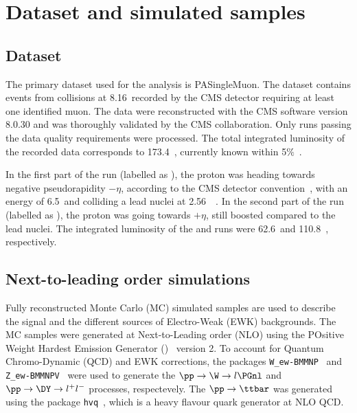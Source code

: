 \section{Dataset and simulated samples} \label{sec:WBoson_Samples}

\subsection{Dataset} \label{sec:WBoson_Samples_Data}

The primary dataset used for the \W analysis is PASingleMuon. The dataset contains events from \pPb collisions at 8.16~\TeV recorded by the CMS detector requiring at least one identified muon. The data were reconstructed with the CMS software version 8.0.30 and was thoroughly validated by the CMS collaboration. Only runs passing the data quality requirements were processed. The total integrated luminosity of the recorded data corresponds to 173.4~\nbinv, currently known within 5$\%$~\cite{LUMI}.

In the first part of the \pPb run (labelled as \RunPbp), the proton was heading towards negative pseudorapidity $-\eta$, according to the CMS detector convention~\cite{CMS}, with an energy of 6.5~\TeV and colliding a lead nuclei at 2.56~\TeV~\cite{LHC}. In the second part of the \pPb run (labelled as \RunpPb), the proton was going towards $+\eta$, still boosted compared to the lead nuclei. The integrated luminosity of the \RunPbp and \RunpPb runs were 62.6~\nbinv and 110.8~\nbinv, respectively.

\subsection{Next-to-leading order simulations} \label{sec:WBoson_Sample_MC}

Fully reconstructed Monte Carlo (MC) simulated samples are used to describe the signal and the different sources of Electro-Weak (EWK) backgrounds. The MC samples were generated at Next-to-Leading order (NLO) using the POsitive Weight Hardest Emission Generator (\POWHEG)~\cite{POWHEG,POWHEG_2,POWHEGBOX} version 2. To account for Quantum Chromo-Dynamic (QCD) and EWK corrections, the \POWHEGBOX  packages \verb#W_ew-BMMNP#~\cite{POWHEGBOX_W_ew_BMNNP} and \verb#Z_ew-BMMNPV#~\cite{POWHEGBOX_Z_ew_BMNNP} were used to generate the $\pp\to\W\to l\PGnl$ and $\pp\to\DY\to l^{+}l^{-}$ processes, respectevely. The $\pp\to\ttbar$ was generated using the \POWHEGBOX package \verb#hvq#~\cite{POWHEGBOX_hvq}, which is a heavy flavour quark generator at NLO QCD. 

